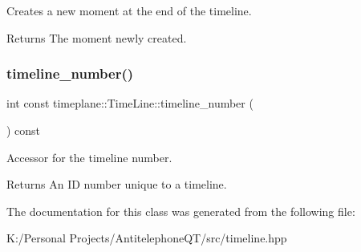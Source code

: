 Creates a new moment at the end of the timeline. 

\begin{DoxyReturn}{Returns}
The moment newly created. 
\end{DoxyReturn}
\mbox{\label{classtimeplane_1_1_time_line_a4297da8acc6fbee73bfc7db0de2f80a5}} 
\subsubsection{\texorpdfstring{timeline\+\_\+number()}{timeline\_number()}}
{\footnotesize\ttfamily int const timeplane\+::\+Time\+Line\+::timeline\+\_\+number (\begin{DoxyParamCaption}{ }\end{DoxyParamCaption}) const\hspace{0.3cm}{\ttfamily [noexcept]}}



Accessor for the timeline number. 

\begin{DoxyReturn}{Returns}
An ID number unique to a timeline. 
\end{DoxyReturn}


The documentation for this class was generated from the following file\+:\begin{DoxyCompactItemize}
\item 
K\+:/\+Personal Projects/\+Antitelephone\+Q\+T/src/timeline.\+hpp\end{DoxyCompactItemize}
